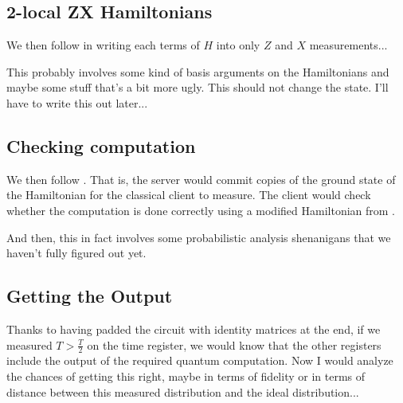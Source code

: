 \subsection{2-local ZX Hamiltonians}

We then follow \cite{biamonte_love_2008} in writing each terms of $H$ into only $Z$ and $X$ measurements...

This probably involves some kind of basis arguments on the Hamiltonians and maybe some stuff that's a bit more ugly. This should not change the state. I'll have to write this out later...

\subsection{Checking computation}

We then follow \cite{mahadev_delegation}. That is, the server would commit copies of the ground state of the Hamiltonian for the classical client to measure. The client would check whether the computation is done correctly using a modified Hamiltonian from \cite{kempe_kitaev_regev_2006}. 

And then, this in fact involves some probabilistic analysis shenanigans that we haven't fully figured out yet.

\subsection{Getting the Output}

Thanks to having padded the circuit with identity matrices at the end, if we measured $T>\frac{T}{2}$ on the time register, we would know that the other registers include the output of the required quantum computation. Now I would analyze the chances of getting this right, maybe in terms of fidelity or in terms of distance between this measured distribution and the ideal distribution...


